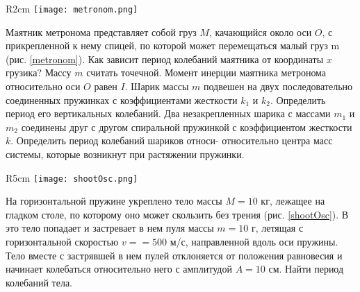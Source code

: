 \begin{wrapfigure}[10]{R}{2cm}
\texttt{[image: metronom.png]}
\caption{}
\label{metronom}
\end{wrapfigure}
\AddProb Маятник метронома представляет собой груз $M$, качающийся около оси $O$, с прикрепленной к нему спицей, по которой может перемещаться малый груз m (рис. \ref{metronom}). Как зависит период колебаний маятника от координаты $x$ грузика? Массу $m$ считать точечной. Момент инерции маятника метронома относительно оси $O$ равен $I$.
\AddProb Шарик массы $m$ подвешен на двух последовательно соединенных пружинках с коэффициентами жесткости $k_1$ и $k_2$. Определить период его вертикальных колебаний.
\AddProb Два незакрепленных шарика с массами $m_1$ и $m_2$ соединены друг с другом спиральной пружинкой с коэффициентом жесткости $k$. Определить период колебаний шариков относи-
относительно центра масс системы, которые возникнут при растяжении пружинки.

\begin{wrapfigure}[7]{R}{5cm}
\texttt{[image: shootOsc.png]}
\caption{}
\label{shootOsc}
\end{wrapfigure}
\AddProb На горизонтальной пружине укреплено тело массы $M = 10$ кг, лежащее на гладком столе, по которому оно может скользить без 
трения (рис. \ref{shootOsc}). В это тело попадает и застревает в нем пуля массы $m = 10$ г, летящая с горизонтальной скоростью $v =
= 500$ м/с, направленной вдоль оси пружины. Тело вместе с застрявшей в нем пулей отклоняется от положения равновесия и начинает колебаться относительно него с амплитудой $A = 10$ см. Найти период колебаний тела.
\clearpage